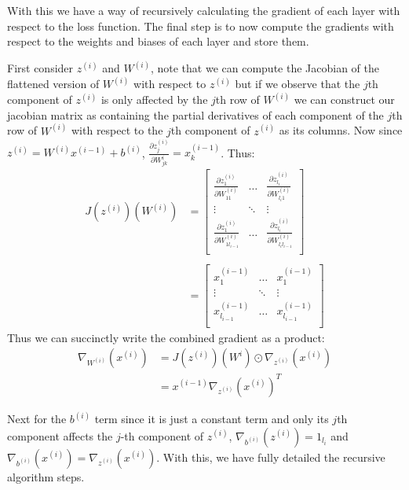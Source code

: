 \documentclass[12pt]{article}
\begin{document}
With this we have a way of recursively calculating the gradient of each layer
with respect to the loss function. The final step is to now compute the gradients with
respect to the weights and biases of each layer and store them.



First consider $z^{(i)}$ and $W^{(i)}$, note that we can compute the Jacobian of the
flattened version of $W^{(i)}$ with respect to $z^{(i)}$ but if we observe that
the $j$th component of $z^{(i)}$ is only affected by the $j$th row of $W^{(i)}$
we can construct our jacobian matrix as containing the partial derivatives of each component of the
$j$th row of $W^{(i)}$ with respect to the $j$th component of $z^{(i)}$ as its columns. Now since
$z^{(i)} = W^{(i)}x^{(i-1)} + b^{(i)}$, $\frac{\partial z^{(i)}_j}{\partial W^{i}_{jk}} = x^{(i-1)}_k$. Thus:
\begin{align*}
    J(z^{(i)})(W^{(i)}) &= \begin{bmatrix}
        \frac{\partial z^{(i)}_1}{\partial W^{(i)}_{11}} & \ldots  & \frac{\partial z^{(i)}_{l_i}}{\partial W^{(i)}_{l_i1}} \\
        \vdots & \ddots & \vdots \\
        \frac{\partial z^{(i)}_1}{\partial W^{(i)}_{1l_{i-1}}} & \ldots  & \frac{\partial z^{(i)}_{l_i}}{\partial W^{(i)}_{l_il_{i-1}}} \\
    \end{bmatrix} \\ \\
    &= \begin{bmatrix}
        x^{(i-1)}_1 & \ldots  & x^{(i-1)}_1 \\
        \vdots & \ddots & \vdots \\
       x^{(i-1)}_{l_{i-1}} & \ldots  & x^{(i-1)}_{l_{i-1}} \\
    \end{bmatrix}
\end{align*}
Thus we can succinctly write the combined gradient as a product:
\begin{align*}
    \nabla_{W^{(i)}}(x^{(i)}) &=  J(z^{(i)})(W^{i}) \odot \nabla_{z^{(i)}}(x^{(i)})\\
    &= x^{(i-1)}\nabla_{z^{(i)}}(x^{(i)})^T
\end{align*}
 
Next for the $b^{(i)}$ term since it is just a constant term and only its $j$th component affects
the $j$-th component of $z^{(i)}$, $\nabla_{b^{(i)}}(z^{(i)}) = 1_{l_i}$ and
$\nabla_{b^{(i)}}(x^{(i)}) = \nabla_{z^{(i)}}(x^{(i)})$. With this, we have
fully detailed the recursive algorithm steps.
\end{document}
